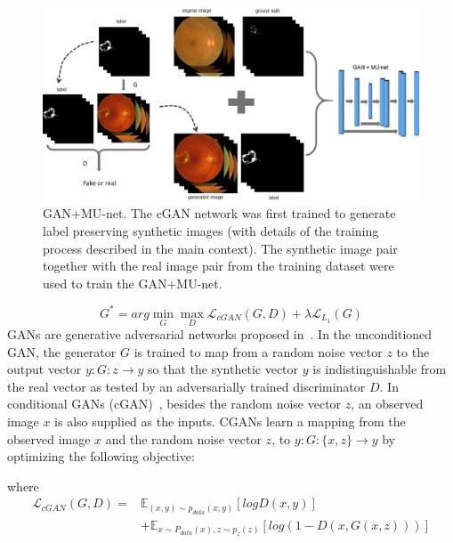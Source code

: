 \documentclass{osa-article}
\begin{document}
\begin{figure}[ht]
\centering
\includegraphics[width=0.95\linewidth]{structure.eps}
\caption{GAN+MU-net. The cGAN network was first trained to generate label preserving synthetic images (with details of the training process described in the main context). The synthetic image pair together with the real image pair from the training dataset were used to train the GAN+MU-net. }
\label{fig:net_structure}
\end{figure} 

\begin{equation}
G^* =arg\mathop{min}\limits_{G}   \mathop{max}\limits_{D}\mathcal{L}_{cGAN}(G,D) + \lambda \mathcal{L}_{L_1}(G)
\label{Eq:GAN_optimizer}
\end{equation}
GANs are generative adversarial networks proposed in~\cite{goodfellow2014generative,denton2015deep,radford2015unsupervised,salimans2016improved,isola2016image}. In the unconditioned GAN, the generator $G$ is trained to map from a random noise vector $z$ to the output vector $y: G:z \rightarrow y$ so that the synthetic vector $y$ is indistinguishable from the real vector as tested by an adversarially trained discriminator $D$. In conditional GANs (cGAN)~\cite{isola2016image}, besides the random noise vector $z$, an observed image $x$ is also supplied as the inputs. CGANs learn a mapping from the observed image $x$ and the random noise vector $z$, to $y: G:\{x, z\}\rightarrow y$ by optimizing the following objective:



where
\begin{equation}\label{eqn3_2}
\begin{aligned}
\mathcal{L}_{cGAN}(G,D) =& \mathbb{E}_{(x,y)\sim p_{data}(x,y)}[log{D(x,y)}]\\& + 
\mathbb{E}_{x\sim P_{data}(x), z\sim p_z(z)}[log(1 - D(x, G(x, z)))]\\
\end{aligned}
\end{equation}
\end{document}
